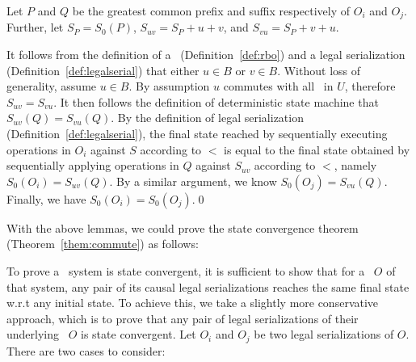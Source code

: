  Let $P$ and $Q$ be the greatest common prefix and suffix
respectively of $O_i$ and $O_j$.  Further, let $S_P=S_0(P)$,
$S_{uv}=S_P+u+v$, and $S_{vu}=S_P+v+u$.

It follows from the definition of a \RBo\ (Definition~\ref{def:rbo}) and a legal serialization (Definition~\ref{def:legalserial})
that either $u\in B$ or $v\in B$.  Without loss of generality, assume
$u\in B$. By assumption $u$ commutes with all \transactions\ in $U$, therefore
$S_{uv}=S_{vu}$. It then follows the definition
of deterministic state machine that $S_{uv}(Q) = S_{vu}(Q)$. 
By the definition of legal serialization (Definition~\ref{def:legalserial}), 
the final state reached by sequentially executing operations in $O_{i}$ 
against $S$ according to $<$ is equal to the final state obtained by 
sequentially applying operations in $Q$ against $S_{uv}$ according to $<$, namely $S_0(O_i)=S_{uv}(Q)$. By
a similar argument, we know $S_0(O_j)=S_{vu}(Q)$. Finally, we have $S_0(O_i)=S_0(O_j)$.\qed


With the above lemmas, we could prove the state convergence theorem (Theorem~\ref{them:commute}) as follows:

 To prove a \RBct\ system is state convergent,
it is sufficient to show that for a \RBo\ $O$ of that system, any pair of its causal legal
serializations reaches the same final state w.r.t any initial state. To achieve
this, we take a slightly more conservative approach, which is to prove 
that any pair of legal serializations of their underlying \RBo\ $O$ is state convergent. 
Let $O_{i}$ and $O_{j}$ be two legal serializations of $O$. There are two cases to consider:

